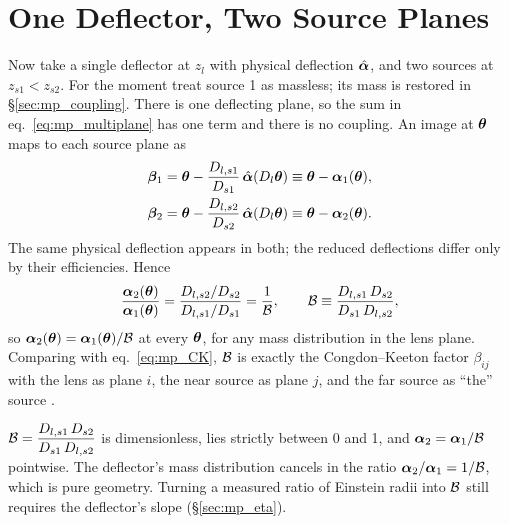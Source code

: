 \section{One Deflector, Two Source Planes}
\label{sec:mp_dspl}

Now take a single deflector at $z_l$ with physical deflection
$\hat{\boldsymbol{\alpha}}$, and two sources at $z_{s1}<z_{s2}$.  For the moment
treat source 1 as massless; its mass is restored in
\S\ref{sec:mp_coupling}.  There is one deflecting plane, so the sum in
eq.~\eqref{eq:mp_multiplane} has one term and there is no coupling.  An
image at $\boldsymbol{\theta}$ maps to each source plane as
\begin{align}
  \boldsymbol{\beta}_{1} &= \boldsymbol{\theta} - \frac{D_{l,s1}}{D_{s1}}\,\hat{\boldsymbol{\alpha}}(D_l\boldsymbol{\theta})
               \equiv \boldsymbol{\theta} - \boldsymbol{\alpha}_{1}(\boldsymbol{\theta}), \label{eq:mp_plane1}\\
  \boldsymbol{\beta}_{2} &= \boldsymbol{\theta} - \frac{D_{l,s2}}{D_{s2}}\,\hat{\boldsymbol{\alpha}}(D_l\boldsymbol{\theta})
               \equiv \boldsymbol{\theta} - \boldsymbol{\alpha}_{2}(\boldsymbol{\theta}). \label{eq:mp_plane2}
\end{align}
The same physical deflection appears in both; the reduced
deflections differ only by their efficiencies.  Hence
\begin{equation}
  \frac{\boldsymbol{\alpha}_{2}(\boldsymbol{\theta})}{\boldsymbol{\alpha}_{1}(\boldsymbol{\theta})}
  = \frac{D_{l,s2}/D_{s2}}{D_{l,s1}/D_{s1}}
  = \frac{1}{\mathcal{B}},
  \qquad
  \mathcal{B} \equiv \frac{D_{l,s1}\,D_{s2}}{D_{s1}\,D_{l,s2}} ,
  \label{eq:mp_Bdef}
\end{equation}
so $\boldsymbol{\alpha}_2(\boldsymbol{\theta})=\boldsymbol{\alpha}_1(\boldsymbol{\theta})/\mathcal{B}$ at every
$\boldsymbol{\theta}$, for any mass distribution in the lens plane.  
Comparing with eq.~\eqref{eq:mp_CK}, $\mathcal{B}$ is exactly the
Congdon--Keeton factor $\beta_{ij}$ with the lens as plane $i$, the near
source as plane $j$, and the far source as ``the'' source .

\begin{keybox}
$\displaystyle \mathcal{B} = \frac{D_{l,s1}\,D_{s2}}{D_{s1}\,D_{l,s2}}$
is dimensionless, lies strictly between 0 and 1, and
$\boldsymbol{\alpha}_2 = \boldsymbol{\alpha}_1/\mathcal{B}$ pointwise.  The deflector's mass
distribution cancels in the ratio $\boldsymbol{\alpha}_2/\boldsymbol{\alpha}_1=1/\mathcal{B}$,
which is pure geometry.  Turning a measured ratio of Einstein radii
into $\mathcal{B}$ still requires the deflector's slope
(\S\ref{sec:mp_eta}).
\end{keybox}

